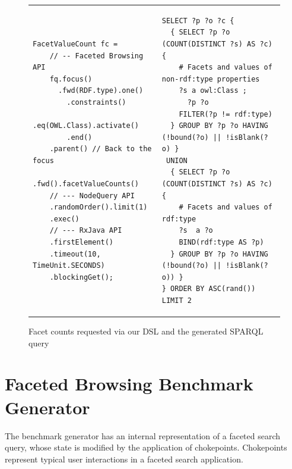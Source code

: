 \begin{figure}
\centering
\bgroup
\def\arraystretch{1.5}
\begin{tabular}{m{6cm}m{10cm}}
\begin{lstlisting}[language=sparql, linewidth=5cm, caption=Forward facets]
FacetValueCount fc =
	// -- Faceted Browsing API
	fq.focus()
	  .fwd(RDF.type).one()
		.constraints()
			.eq(OWL.Class).activate()
		.end()
	.parent() // Back to the focus
	  .fwd().facetValueCounts()
	// --- NodeQuery API
	.randomOrder().limit(1)
	.exec()
	// --- RxJava API
	.firstElement()
	.timeout(10, TimeUnit.SECONDS)
	.blockingGet();
\end{lstlisting}

&

\begin{lstlisting}[language=sparql, linewidth=9cm, caption=Backward facets]
SELECT ?p ?o ?c {
  { SELECT ?p ?o (COUNT(DISTINCT ?s) AS ?c) {
    # Facets and values of non-rdf:type properties
    ?s a owl:Class ;
      ?p ?o
    FILTER(?p != rdf:type)
  } GROUP BY ?p ?o HAVING (!bound(?o) || !isBlank(?o) }
 UNION
  { SELECT ?p ?o (COUNT(DISTINCT ?s) AS ?c) {
    # Facets and values of rdf:type
    ?s  a ?o
    BIND(rdf:type AS ?p)
  } GROUP BY ?p ?o HAVING (!bound(?o) || !isBlank(?o)) }
} ORDER BY ASC(rand()) LIMIT 2
\end{lstlisting}

\\

\end{tabular}
\egroup
\caption{Facet counts requested via our DSL and the generated SPARQL query}
\label{fig:engine-real-example}
\end{figure}








\section{Faceted Browsing Benchmark Generator}
\label{sec:benchmark-generator}
The benchmark generator has an internal representation of a faceted search query, whose state is modified by the application of chokepoints. Chokepoints represent typical user interactions in a faceted search application.

